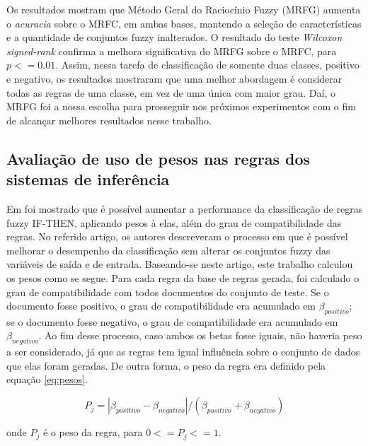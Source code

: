 \documentclass[template.tex]{subfiles}
\begin{document}
%
%
%

Os resultados mostram que Método Geral do Raciocínio Fuzzy (MRFG) aumenta o \textit{acuracia} sobre o MRFC, em ambas bases,  mantendo a seleção de características e a quantidade de conjuntos fuzzy inalterados. O resultado do teste \textit{Wilcoxon signed-rank} confirma a melhora significativa do MRFG sobre o MRFC, para $p <= 0.01$. Assim, nessa tarefa de classificação de somente duas classes, positivo e negativo, os resultados mostraram que uma melhor abordagem é considerar todas as regras de uma classe, em vez de uma única com maior grau. Daí, o MRFG foi a nossa escolha para prosseguir nos próximos experimentos com o fim de alcançar melhores resultados nesse trabalho.

\subsection{Avaliação de uso de pesos nas regras dos sistemas de inferência}

Em \cite{ishibuchi2001effect} foi mostrado que é possível aumentar a performance da classificação de regras fuzzy IF-THEN, aplicando pesos à elas, além do grau de compatibilidade das regras. No referido artigo, os autores descreveram o processo em que é possível melhorar o desempenho da classificação sem alterar os conjuntos fuzzy das variáveis de saída e de entrada. Baseando-se neste artigo, este trabalho calculou os pesos como se segue. Para cada regra da base de regras gerada, foi calculado o grau de compatibilidade com todos documentos do conjunto de teste. Se o documento fosse positivo, o grau de compatibilidade era acumulado em $\beta_{positivo}$; se o documento fosse negativo, o grau de compatibilidade era acumulado em $\beta_{negativo}$. Ao fim desse processo, caso ambos os betas fosse iguais, não haveria peso a ser considerado, já que as regras tem igual influência sobre o conjunto de dados que elas foram geradas. De outra forma, o peso da regra era definido pela equação \ref{eq:pesos}.

\begin{equation}
P_j = |\beta_{positivo} - \beta_{negativo}| / (\beta_{positivo} + \beta_{negativo})
\label{eq:pesos}
\end{equation}

onde $P_j$ é o peso da regra, para $0 <= P_j <= 1$. 
\end{document}
